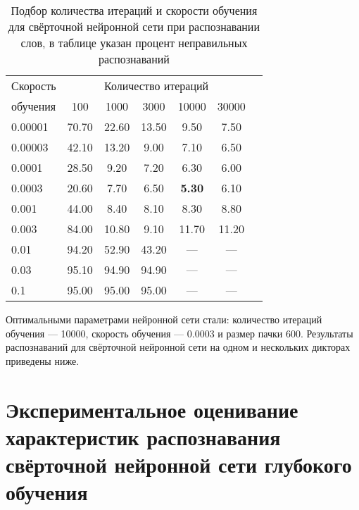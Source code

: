 \begin{table}[h]
	\centering
	\caption{Подбор количества итераций и скорости обучения для свёрточной нейронной сети при распознавании слов, в таблице указан процент неправильных распознаваний}
	\label{tab:cnn_bf_iter_pace}
	\begin{tabular}{| l | c | c | c | c | c | c |}
		\hline
		Скорость & \multicolumn{5}{c|}{Количество итераций} \\
		\hhline{~-----}
		обучения \phantom{00} & \phantom{000} 100 \phantom{000} & \phantom{000}1000\phantom{000} & \phantom{000}3000\phantom{000} & \phantom{00} 10000 \phantom{00} & \phantom{00} 30000 \phantom{00} \\
		\hline
		0.00001	& 70.70 & 22.60 & 13.50 &  9.50 &  7.50 \\
		0.00003	& 42.10 & 13.20 &  9.00 &  7.10 &  6.50 \\
		0.0001	& 28.50 &  9.20 &  7.20 &  6.30 &  6.00 \\
		0.0003	& 20.60 &  7.70 &  6.50 & \textbf{5.30} &  6.10 \\
		0.001	& 44.00 &  8.40 &  8.10 &  8.30 &  8.80 \\
		0.003	& 84.00 & 10.80 &  9.10 & 11.70 & 11.20 \\
		0.01	& 94.20 & 52.90 & 43.20 & \multicolumn{1}{c|}{---} & \multicolumn{1}{c|}{---} \\	
		0.03	& 95.10 & 94.90 & 94.90 & \multicolumn{1}{c|}{---} & \multicolumn{1}{c|}{---} \\	
		0.1		& 95.00 & 95.00 & 95.00 & \multicolumn{1}{c|}{---} & \multicolumn{1}{c|}{---} \\
		\hline
	\end{tabular}
\end{table}

Оптимальными параметрами нейронной сети стали: количество итераций обучения --- 10000, скорость обучения --- 0.0003 и размер пачки 600.
Результаты распознаваний для свёрточной нейронной сети на одном и нескольких дикторах приведены ниже.


\section{Экспериментальное оценивание характеристик распознавания свёрточной нейронной сети глубокого обучения} \label{sect4_3}

